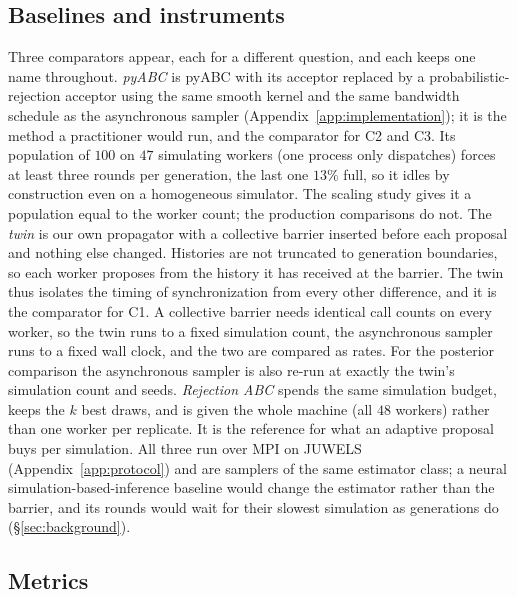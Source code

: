 \documentclass[10pt]{article}
\theoremstyle{plain}
\theoremstyle{definition}
\begin{document}
\subsection{Baselines and instruments}\label{sec:experiments-baselines}\label{sec:implementation}
Three comparators appear, each for a different question, and each keeps one name throughout. \emph{pyABC} is pyABC \citep{klinger2018pyabc,schalte2022pyabc} with its acceptor replaced by a probabilistic-rejection acceptor using the same smooth kernel and the same bandwidth schedule as the asynchronous sampler (Appendix~\ref{app:implementation}); it is the method a practitioner would run, and the comparator for C2 and C3. Its population of $100$ on $47$ simulating workers (one process only dispatches) forces at least three rounds per generation, the last one $13\%$ full, so it idles by construction even on a homogeneous simulator. The scaling study gives it a population equal to the worker count; the production comparisons do not. The \emph{twin} is our own propagator with a collective barrier inserted before each proposal and nothing else changed. Histories are not truncated to generation boundaries, so each worker proposes from the history it has received at the barrier. The twin thus isolates the timing of synchronization from every other difference, and it is the comparator for C1. A collective barrier needs identical call counts on every worker, so the twin runs to a fixed simulation count, the asynchronous sampler runs to a fixed wall clock, and the two are compared as rates. For the posterior comparison the asynchronous sampler is also re-run at exactly the twin's simulation count and seeds. \emph{Rejection ABC} spends the same simulation budget, keeps the $k$ best draws, and is given the whole machine (all $48$ workers) rather than one worker per replicate. It is the reference for what an adaptive proposal buys per simulation. All three run over MPI on JUWELS (Appendix~\ref{app:protocol}) and are samplers of the same estimator class; a neural simulation-based-inference baseline would change the estimator rather than the barrier, and its rounds would wait for their slowest simulation as generations do (\S\ref{sec:background}).

\subsection{Metrics}\label{sec:experiments-metrics}
\end{document}
